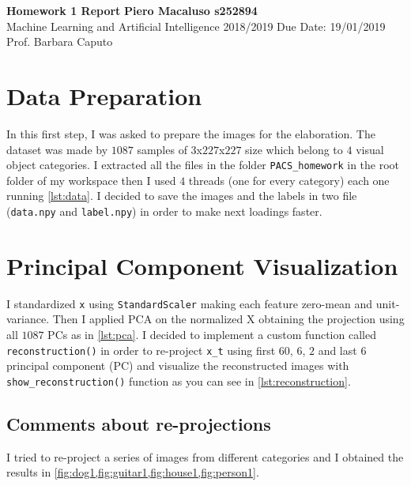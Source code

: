 \documentclass[a4paper, 11pt]{article}
\begin{document}
	\noindent
	\large\textbf{Homework 1 Report} \hfill \textbf{Piero Macaluso s252894} \\
	\normalsize Machine Learning and Artificial Intelligence 2018/2019 \hfill Due Date: 19/01/2019 \\
	Prof. Barbara Caputo  
	
	\section{Data Preparation}
	\showthe\columnwidth
	
	In this first step, I was asked to prepare the images for the elaboration. The dataset was made by $1087$ samples of $3$x$227$x$227$ size which belong to $4$ visual object categories.
	I extracted all the files in the folder \texttt{PACS\_homework} in the root folder of my workspace then I used $4$ threads (one for every category) each one running \vref{lst:data}.
	I decided to save the images and the labels in two file (\texttt{data.npy} and \texttt{label.npy}) in order to make next loadings faster.
	
		
	\section{Principal Component Visualization}
	I standardized \texttt{x} using \texttt{StandardScaler} making each feature zero-mean and unit-variance. Then I applied PCA on the normalized X obtaining the projection using all $1087$ PCs as in \vref{lst:pca}.
	I decided to implement a custom function called \texttt{reconstruction()} in order to re-project \texttt{x\_t} using first $60$, $6$, $2$ and last $6$ principal component (PC) and visualize the reconstructed images with \texttt{show\_reconstruction()} function as you can see in \vref{lst:reconstruction}.
	
	
	
	
	
	\subsection{Comments about re-projections}
	I tried to re-project a series of images from different categories and I obtained the results in \vref{fig:dog1,fig:guitar1,fig:house1,fig:person1}.
	
\end{document}
